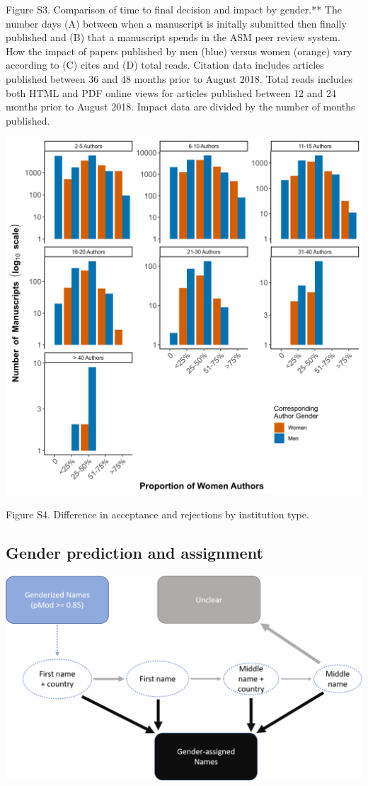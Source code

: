 \documentclass[11pt,]{article}
\begin{document}
Figure S3. Comparison of time to final decision and impact by gender.**
The number days (A) between when a manuscript is initally submitted then
finally published and (B) that a manuscript spends in the ASM peer
review system. How the impact of papers published by men (blue) versus
women (orange) vary according to (C) cites and (D) total reads. Citation
data includes articles published between 36 and 48 months prior to
August 2018. Total reads includes both HTML and PDF online views for
articles published between 12 and 24 months prior to August 2018. Impact
data are divided by the number of months published.

\includegraphics{Figure_S4.png}

Figure S4. Difference in acceptance and rejections by institution type.

\newpage

\subsection{Gender prediction and
assignment}\label{gender-prediction-and-assignment}

\includegraphics{genderize_method.png}
\end{document}

